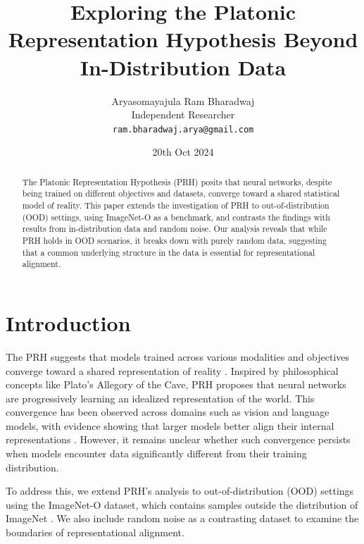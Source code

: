 \documentclass[10pt,a4paper]{article}
\title{Exploring the Platonic Representation Hypothesis Beyond In-Distribution Data}
\author{Aryasomayajula Ram Bharadwaj\\
Independent Researcher\\
\texttt{ram.bharadwaj.arya@gmail.com}}
\date{20th Oct 2024}
\begin{document}
\maketitle

\begin{abstract}
The Platonic Representation Hypothesis (PRH) \cite{huh2024prh} posits that neural networks, despite being trained on different objectives and datasets, converge toward a shared statistical model of reality. This paper extends the investigation of PRH to out-of-distribution (OOD) settings, using ImageNet-O as a benchmark, and contrasts the findings with results from in-distribution data and random noise. Our analysis reveals that while PRH holds in OOD scenarios, it breaks down with purely random data, suggesting that a common underlying structure in the data is essential for representational alignment.
\end{abstract}

\section{Introduction}
The PRH suggests that models trained across various modalities and objectives converge toward a shared representation of reality \cite{huh2024prh}. Inspired by philosophical concepts like Plato’s Allegory of the Cave, PRH proposes that neural networks are progressively learning an idealized representation of the world. This convergence has been observed across domains such as vision and language models, with evidence showing that larger models better align their internal representations \cite{huh2024prh}. However, it remains unclear whether such convergence persists when models encounter data significantly different from their training distribution.

To address this, we extend PRH's analysis to out-of-distribution (OOD) settings using the ImageNet-O dataset, which contains samples outside the distribution of ImageNet \cite{hendrycks2021nae}. We also include random noise as a contrasting dataset to examine the boundaries of representational alignment.
\end{document}
